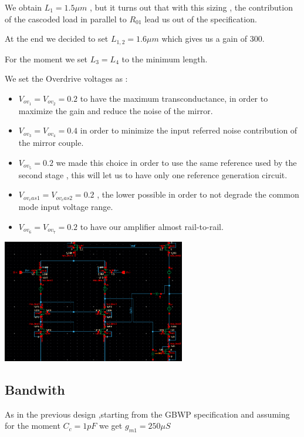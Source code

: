 We obtain $L_1=1.5 \mu m$ , but it turns out that with this sizing , the contribution of the cascoded load in parallel to $R_{01}$ lead us out of the specification.

At the end we decided to set $L_{1,2} = 1.6 \mu m$ which gives us a gain of 300.

For the moment we set $L_3=L_4$ to the minimum length.

We set the Overdrive voltages as :

\begin{itemize}
	\item $V_{ov_1}=V_{ov_2}=0.2$ to have the maximum transconductance, in order to maximize the gain and reduce the noise of the mirror.

	\item $V_{ov_3}=V_{ov_4}=0.4$ in order to minimize the input referred noise contribution of the mirror couple.

	\item $V_{ov_5}=0.2$ we made this choice in order to use the same reference used by the second stage , this will let us to have only one reference generation circuit.

	\item $V_{ov_cas1}=V_{ov_cas2}=0.2$ , the lower possible in order to not degrade the common mode input voltage range.

	\item $V_{ov_6}=V_{ov_7}=0.2$ to have our amplifier almost rail-to-rail.

\end{itemize}


\centering
\includegraphics[width=0.6\textwidth]{Capitoli/dc.png}
\raggedright


\subsection{Bandwith} %
\label{sub:bandwith}

As in the previous design ,starting from the GBWP specification and assuming for the moment $C_c=1pF$ we get $g_{m1}= 250 \mu S$ 

